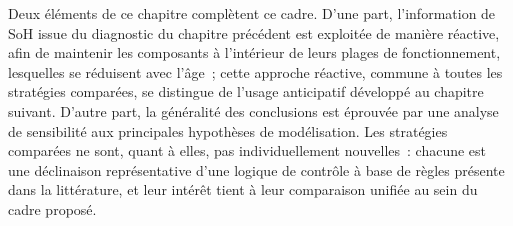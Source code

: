 Deux éléments de ce chapitre complètent ce cadre.
D'une part, l'information de SoH issue du diagnostic du chapitre précédent est exploitée de manière réactive, afin de maintenir les composants à l'intérieur de leurs plages de fonctionnement, lesquelles se réduisent avec l'âge~; cette approche réactive, commune à toutes les stratégies comparées, se distingue de l'usage anticipatif développé au chapitre suivant.
D'autre part, la généralité des conclusions est éprouvée par une analyse de sensibilité aux principales hypothèses de modélisation.
Les stratégies comparées ne sont, quant à elles, pas individuellement nouvelles~: chacune est une déclinaison représentative d'une logique de contrôle à base de règles présente dans la littérature, et leur intérêt tient à leur comparaison unifiée au sein du cadre proposé.
